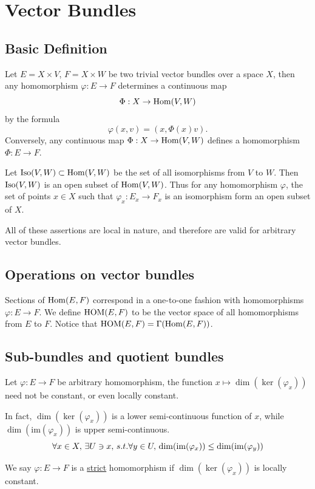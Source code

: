 \section{Vector Bundles}
\label{sec:vector_bundles}
\subsection{Basic Definition}
Let $E=X\times V$, $F=X\times W$ be two trivial vector bundles over a space $X$, 
then any homomorphism $\varphi:E\to F$ determines a continuous map
\[
\Phi:X\to \mathrm{Hom}(V,W)
\]
by the formula
\[
\varphi(x,v)=(x,\Phi(x)v).
\]
Conversely, any continuous map $\Phi:X\to \mathrm{Hom}(V,W)$ defines a homomorphism
$\Phi:E\to F$. 

Let ${\rm Iso}(V,W)\subset \mathrm{Hom}(V,W)$ be the set of all isomorphisms from $V$ to $W$. 
Then ${\rm Iso}(V,W)$ is an open subset of $\mathrm{Hom}(V,W)$. Thus for any homomorphism 
$\varphi$, the set of points $x\in X$ such that $\varphi_x:E_x\to F_x$ is an
isomorphism form an open subset of $X$. 

All of these assertions are local in nature, and therefore are valid for
arbitrary vector bundles. 

\subsection{Operations on vector bundles}
Sections of $\mathrm{Hom}(E,F)$ correspond in a one-to-one fashion with homomorphisms
$\varphi:E\to F$. We define ${\rm HOM}(E,F)$ to be the vector space of all 
homomorphisms from $E$ to $F$. Notice that ${\rm HOM}(E,F) = \Gamma(\mathrm{Hom}(E,F))$. 

\subsection{Sub-bundles and quotient bundles}
Let $\varphi:E\to F$ be arbitrary homomorphism, the function 
$x\mapsto\dim(\ker(\varphi_x))$ need not be constant, or even locally constant. 

In fact, $\dim(\ker(\varphi_x))$ is a lower semi-continuous function of $x$, 
while $\dim(\mathrm{im}(\varphi_x))$ is upper semi-continuous. 
\[
\forall x\in X,\, \exists U\ni x,\, s.t. \forall y\in U,\, 
\dim(\mathrm{im}(\varphi_x))\leq\dim(\mathrm{im}(\varphi_y))
\]

\begin{definition}
    We say $\varphi:E\to F$ is a \underline{strict} homomorphism if 
    $\dim(\ker(\varphi_x))$ is locally constant.
\end{definition}

